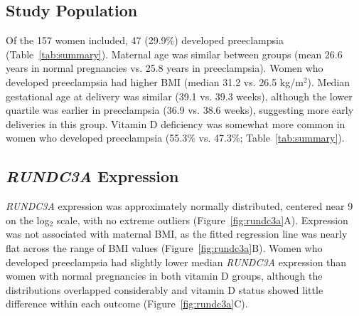 \documentclass[11pt]{article}
\begin{document}
\subsection{Study Population}
Of the 157 women included, 47 (29.9\%) developed preeclampsia (Table~\ref{tab:summary}). Maternal age was similar between groups (mean 26.6 years in normal pregnancies vs. 25.8 years in preeclampsia). Women who developed preeclampsia had higher BMI (median 31.2 vs. 26.5 kg/m$^2$). Median gestational age at delivery was similar (39.1 vs. 39.3 weeks), although the lower quartile was earlier in preeclampsia (36.9 vs. 38.6 weeks), suggesting more early deliveries in this group. Vitamin D deficiency was somewhat more common in women who developed preeclampsia (55.3\% vs. 47.3\%; Table~\ref{tab:summary}).

\begin{table}[htbp]
\centering
\caption{Characteristics of the study population stratified by pregnancy outcome. Continuous variables are reported as mean (SD) or median [IQR], and vitamin D status as n (\%), with deficiency defined as $<$20 ng/mL.}
\label{tab:summary}
\end{table}

\subsection{\textit{RUNDC3A} Expression}
\textit{RUNDC3A} expression was approximately normally distributed, centered near 9 on the log$_2$ scale, with no extreme outliers (Figure~\ref{fig:rundc3a}A). Expression was not associated with maternal BMI, as the fitted regression line was nearly flat across the range of BMI values (Figure~\ref{fig:rundc3a}B). Women who developed preeclampsia had slightly lower median \textit{RUNDC3A} expression than women with normal pregnancies in both vitamin D groups, although the distributions overlapped considerably and vitamin D status showed little difference within each outcome (Figure~\ref{fig:rundc3a}C).
\end{document}
